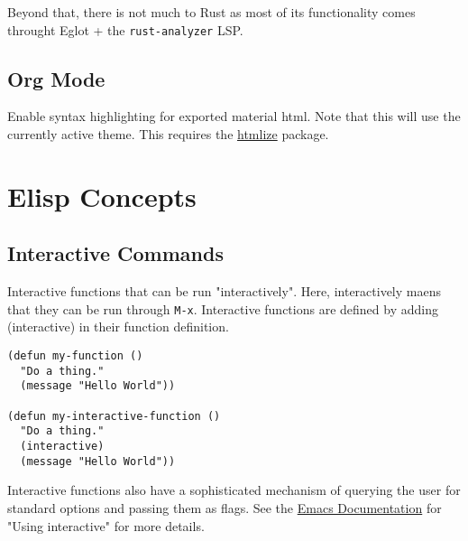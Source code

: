 \documentclass[11pt]{article}
\begin{document}
Beyond that, there is not much to Rust as most of its functionality comes
throught Eglot + the \texttt{rust-analyzer} LSP.
\subsection{Org Mode}
\label{sec:org669a463}

Enable syntax highlighting for exported material html. Note that this will use
the currently active theme. This requires the \href{https://elpa.nongnu.org/nongnu/htmlize.html}{htmlize} package.
\section{Elisp Concepts}
\label{sec:org25f77ec}

\subsection{Interactive Commands}
\label{sec:org09a659c}

Interactive functions that can be run "interactively". Here, interactively maens
that they can be run through \texttt{M-x}. Interactive functions are defined by adding
(interactive) in their function definition.

\begin{verbatim}
(defun my-function ()
  "Do a thing."
  (message "Hello World"))

(defun my-interactive-function ()
  "Do a thing."
  (interactive)
  (message "Hello World"))
\end{verbatim}

Interactive functions also have a sophisticated mechanism of querying the user
for standard options and passing them as flags. See the \href{https://www.gnu.org/software/emacs/manual/html\_node/elisp/Using-Interactive.html}{Emacs Documentation} for
"Using interactive" for more details.
\end{document}
